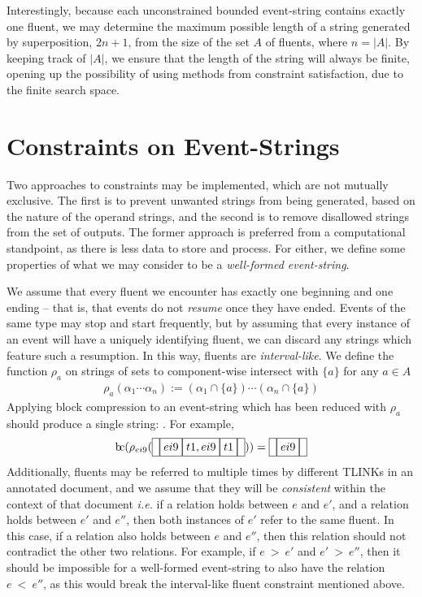 \documentclass[a4paper,11pt]{article}
\makeatletter
\newcommand{\bc}{{\rm b\!c}}
\newcommand{\vph}[1]{\vphantom{#1}}
\newcommand{\ebox}[1]{\fbox{$\vph{',}#1$}}
\newcommand{\eboxb}[1]{\fbox{$\vph{@}#1$}}
\makeatother
\begin{document}
Interestingly, because each unconstrained bounded event-string contains exactly 
one fluent, we may determine the maximum possible length of a string generated 
by superposition, $2n + 1$, from the size of the set $A$ of fluents, where $n = 
|A|$. By keeping track of $|A|$, we ensure that the length of the string will 
always be finite, opening up the possibility of using methods from constraint 
satisfaction, due to the finite search space.

\section{Constraints on Event-Strings}\label{constraints}
Two approaches to constraints may be implemented, which are not mutually 
exclusive. The first is to prevent unwanted strings from being generated, based 
on the nature of the operand strings, and the second is to remove disallowed 
strings from the set of outputs. The former approach is preferred from a 
computational standpoint, as there is less data to store and process. For 
either, we define some properties of what we may consider to be a 
\textit{well-formed event-string}.

We assume that every fluent we encounter has exactly one beginning and one 
ending -- that is, that events do not \textit{resume} once they have ended. 
Events of the same type may stop and start frequently, but by assuming that 
every instance of an event will have a uniquely identifying fluent, we can 
discard any strings which feature such a resumption. In this way, fluents are 
\textit{interval-like}. We define the function 
$\rho_a$ on strings of sets to component-wise intersect with $\{a\}$ for any $a 
\in A$ \citep{fernando2016prior}
\begin{align*}
\rho_a(\alpha_1 \cdots \alpha_n) := (\alpha_1 \cap \{a\}) \cdots (\alpha_n \cap 
\{a\})
\end{align*}
Applying block compression to an event-string which has been reduced with 
$\rho_a$ should produce a single string: \eboxb{}\eboxb{a}\eboxb{}. For example,
\begin{align*}
\bc{}(\rho_{ei9}(\ebox{}\ebox{ei9}\ebox{t1, ei9}\ebox{t1}\ebox{})) = 
\ebox{}\ebox{ei9}\ebox{}
\end{align*}
Additionally, fluents may be referred to multiple times by different TLINKs in 
an annotated document, and we assume that they will be \textit{consistent} 
within the context of that document \textit{i.e.} if a relation holds between 
$e$ and $e'$, and a relation holds between $e'$ and $e''$, then both instances 
of $e'$ refer to the same fluent. In this case, if a relation also holds 
between $e$ and $e''$, then this relation should not contradict the other two 
relations. For example, if $e~>~e'$ and $e'~>~e''$, then it should be 
impossible for a well-formed event-string to also have the relation $e~<~e''$, 
as this would break the interval-like fluent constraint mentioned above.
\end{document}
